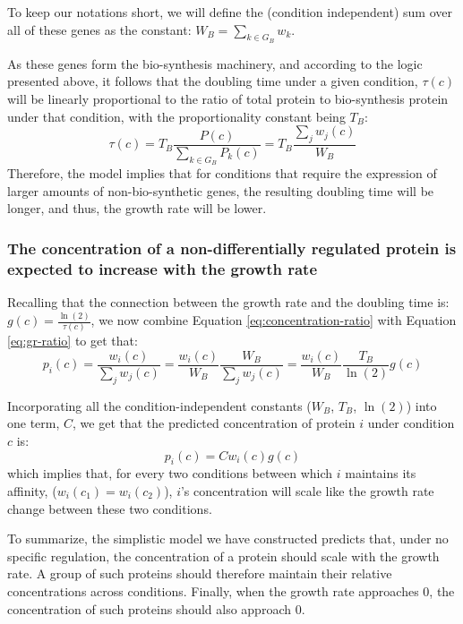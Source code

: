 \documentclass[notitlepage]{article}
\begin{document}
To keep our notations short, we will define the (condition independent) sum over all of these genes as the constant: $W_B = \sum_{k\in G_B}w_k$.

As these genes form the bio-synthesis machinery, and according to the logic presented above, it follows that the doubling time under a given condition, $\tau(c)$ will be linearly proportional to the ratio of total protein to bio-synthesis protein under that condition, with the proportionality constant being $T_B$:
\begin{equation}
  \label{eq:gr-ratio}
  \tau(c) = T_B\frac{P(c)}{\sum_{k\in G_B}P_k(c)}=T_B\frac{\sum_jw_j(c)}{W_B}
\end{equation}
Therefore, the model implies that for conditions that require the expression of larger amounts of non-bio-synthetic genes, the resulting doubling time will be longer, and thus, the growth rate will be lower.

\subsubsection{The concentration of a non-differentially regulated protein is expected to increase with the growth rate} 
Recalling that the connection between the growth rate and the doubling time is: $g(c)=\frac{\ln(2)}{\tau(c)}$, we now combine Equation \ref{eq:concentration-ratio} with Equation \ref{eq:gr-ratio} to get that:
\begin{equation}
  \label{eq:default-response}
  p_i(c)=\frac{w_i(c)}{\sum_jw_j(c)}=\frac{w_i(c)}{W_B}\frac{W_B}{\sum_jw_j(c)}=\frac{w_i(c)}{W_B}\frac{T_B}{\ln(2)}g(c)
\end{equation}

Incorporating all the condition-independent constants ($W_B$, $T_B$, $\ln(2)$) into one term, $C$, we get that the predicted concentration of protein $i$ under condition $c$ is:
\begin{equation}
  \label{eq:final-conc}
  p_i(c)=Cw_i(c)g(c)
\end{equation}
which implies that, for every two conditions between which $i$ maintains its affinity, ($w_i(c_1)=w_i(c_2)$), $i$'s concentration will scale like the growth rate change between these two conditions.

To summarize, the simplistic model we have constructed predicts that, under no specific regulation, the concentration of a protein should scale with the growth rate.
A group of such proteins should therefore maintain their relative concentrations across conditions.
Finally, when the growth rate approaches 0, the concentration of such proteins should also approach 0.
\end{document}
